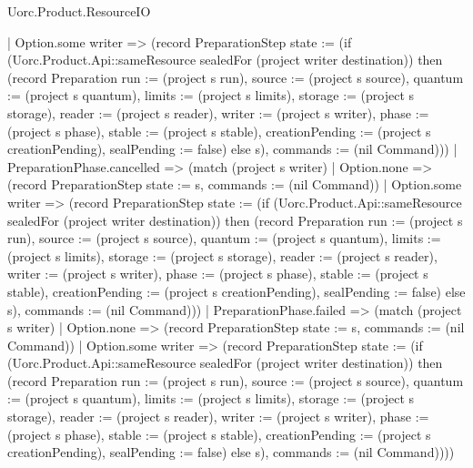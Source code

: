 \begin{lexlean}{Uorc.Product.ResourceIO}
\begin{semanticmodule}
{      | Option.some writer => (record PreparationStep {state := (if (Uorc.Product.Api::sameResource sealedFor (project writer destination)) then (record Preparation {run := (project s run), source := (project s source), quantum := (project s quantum), limits := (project s limits), storage := (project s storage), reader := (project s reader), writer := (project s writer), phase := (project s phase), stable := (project s stable), creationPending := (project s creationPending), sealPending := false}) else s), commands := (nil Command)}))
    | PreparationPhase.cancelled => (match (project s writer)
      | Option.none => (record PreparationStep {state := s, commands := (nil Command)})
      | Option.some writer => (record PreparationStep {state := (if (Uorc.Product.Api::sameResource sealedFor (project writer destination)) then (record Preparation {run := (project s run), source := (project s source), quantum := (project s quantum), limits := (project s limits), storage := (project s storage), reader := (project s reader), writer := (project s writer), phase := (project s phase), stable := (project s stable), creationPending := (project s creationPending), sealPending := false}) else s), commands := (nil Command)}))
    | PreparationPhase.failed => (match (project s writer)
      | Option.none => (record PreparationStep {state := s, commands := (nil Command)})
      | Option.some writer => (record PreparationStep {state := (if (Uorc.Product.Api::sameResource sealedFor (project writer destination)) then (record Preparation {run := (project s run), source := (project s source), quantum := (project s quantum), limits := (project s limits), storage := (project s storage), reader := (project s reader), writer := (project s writer), phase := (project s phase), stable := (project s stable), creationPending := (project s creationPending), sealPending := false}) else s), commands := (nil Command)})))
}


\end{semanticmodule}
\end{lexlean}
